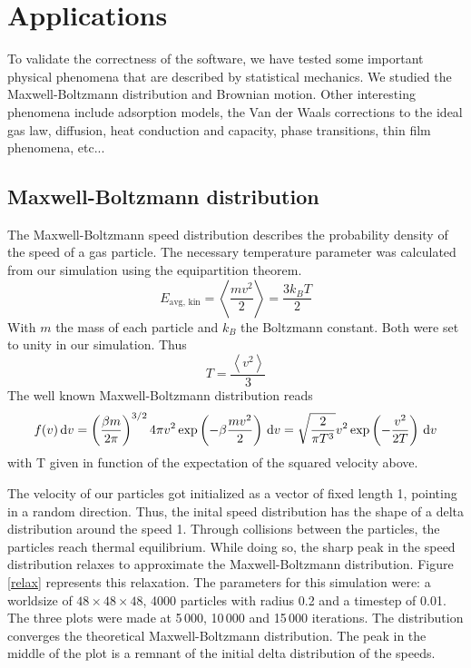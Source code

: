 \section{Applications}

To validate the correctness of the software, we have tested some important 
physical phenomena that are described by statistical mechanics. We studied 
the Maxwell-Boltzmann distribution and Brownian motion. Other interesting 
phenomena include adsorption models, the Van der Waals corrections to the 
ideal gas law, diffusion, heat conduction and capacity, phase transitions, 
thin film phenomena, etc...

\subsection{Maxwell-Boltzmann distribution}
The Maxwell-Boltzmann speed distribution describes the probability density of 
the speed of a gas particle. The necessary temperature parameter was calculated 
from our simulation using the equipartition theorem.
$$
E_{\textrm{avg, kin}} = \left< \frac{mv^2}{2} \right> = \frac{3k_BT}{2}
$$
With $m$ the mass of each particle and $k_B$ the Boltzmann constant. Both were 
set to unity in our simulation. Thus
$$
T = \frac{\left< v^2 \right>}{3}
$$
The well known Maxwell-Boltzmann distribution reads \cite{maxwellDist}
$$
f(v)\,\mathrm d v = \left( \frac{\beta m}{2 \pi} \right)^{3/2} 4 \pi v^2
\exp\left( -\beta \frac{mv^2}{2}\right) \,\mathrm d v =
\sqrt{ \frac{2}{\pi T^3} } v^2 \exp \left(-\frac{v^2}{2T}\right) \,\mathrm d v
$$
with T given in function of the expectation of the squared velocity above.

The velocity of our particles got initialized as a vector of fixed length 
1, pointing in a random direction. Thus, the inital speed distribution has 
the shape of a delta distribution around the speed 1. Through collisions 
between the particles, the particles reach thermal equilibrium. While doing 
so, the sharp peak in the speed distribution relaxes to approximate the 
Maxwell-Boltzmann distribution. Figure \ref{relax} represents this relaxation.  
The parameters for this simulation were: a worldsize of $48 \times 48 \times 
48$, 4000 particles with radius 0.2 and a timestep of 0.01. The three plots 
were made at 5\,000, 10\,000 and 15\,000 iterations. The distribution converges 
the theoretical Maxwell-Boltzmann distribution. The peak in the middle of the 
plot is a remnant of the initial delta distribution of the speeds.


